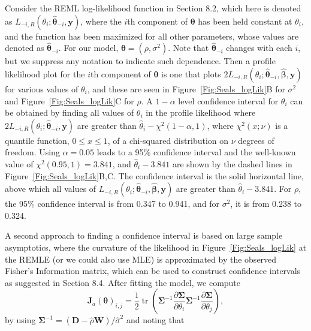 \documentclass[12pt, titlepage]{article}
\begin{document}
Consider the REML log-likelihood function in Section 8.2, which here is denoted as $L_{-i,R}(\theta_{i};\hat{\boldsymbol{\theta}}_{-i},\mathbf{y})$, where the $i$th component of $\boldsymbol{\theta}$ has been held constant at $\theta_{i}$, and the function has been maximized for all other parameters, whose values are denoted as $\hat{\boldsymbol{\theta}}_{-i}$.  For our model, $\boldsymbol{\theta} = (\rho, \sigma^{2})$.  Note that $\hat{\boldsymbol{\theta}}_{-i}$ changes with each $i$, but we suppress any notation to indicate such dependence. Then a profile likelihood plot for the $i$th component of $\boldsymbol{\theta}$ is one that plots $2L_{-i,R}(\theta_{i};\hat{\boldsymbol{\theta}}_{-i},\hat{\boldsymbol{\beta}},\mathbf{y})$ for various values of $\theta_{i}$, and these are seen in Figure~\ref{Fig:Seals_logLik}B for $\sigma^{2}$ and Figure~\ref{Fig:Seals_logLik}C for $\rho$.  A $1-\alpha$ level confidence interval for $\theta_{i}$ can be obtained by finding all values of $\theta_{i}$ in the profile likelihood where $2L_{-i,R}(\theta_{i};\hat{\boldsymbol{\theta}}_{-i},\mathbf{y})$ are greater than $\hat{\theta}_{i} - \chi^{2}(1-\alpha,1)$, where $\chi^{2}(x;\nu)$ is a quantile function, $0 \le x \le1$, of a chi-squared distribution on $\nu$ degrees of freedom. Using $\alpha = 0.05$ leads to a 95\% confidence interval and the well-known value of $\chi^{2}(0.95,1) = 3.841$, and $\hat{\theta}_{i} - 3.841$ are shown by the dashed lines in Figure~\ref{Fig:Seals_logLik}B,C. The confidence interval is the solid horizontal line, above which all values of $L_{-i,R}(\theta_{i};\hat{\boldsymbol{\theta}}_{-i},\hat{\boldsymbol{\beta}},\mathbf{y})$ are greater than $\hat{\theta}_{i} - 3.841$. For $\rho$, the 95\% confidence interval is from 0.347 to 0.941, and for $\sigma^{2}$, it is from 0.238 to 0.324. 

A second approach to finding a confidence interval is based on large sample asymptotics, where the curvature of the likelihood in Figure~\ref{Fig:Seals_logLik} at the REMLE (or we could also use MLE) is approximated by the observed Fisher's Information matrix, which can be used to construct confidence intervals as suggested in Section 8.4.  After fitting the model, we compute 
$$
\boldsymbol{J}_{a}{(\boldsymbol{\theta})_{i,j}} = \frac{1}{2}\operatorname{tr}\left(\boldsymbol{\Sigma}^{-1} \frac{\partial \boldsymbol{\Sigma}}{\partial\theta_i}{\boldsymbol{\Sigma}^{-1}}\frac{\partial\boldsymbol{\Sigma}}{\partial\theta_j}\right),
$$
by using $\boldsymbol{\Sigma}^{-1} = (\mathbf{D} - \hat{\rho}\mathbf{W})/\hat{\sigma}^{2}$ and noting that 
\end{document}
